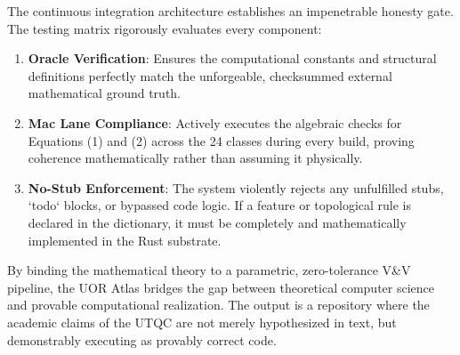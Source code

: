 The continuous integration architecture establishes an impenetrable honesty gate. The testing matrix rigorously evaluates every component:
\begin{enumerate}
    \item \textbf{Oracle Verification}: Ensures the computational constants and structural definitions perfectly match the unforgeable, checksummed external mathematical ground truth.
    \item \textbf{Mac Lane Compliance}: Actively executes the algebraic checks for Equations (1) and (2) across the 24 classes during every build, proving coherence mathematically rather than assuming it physically.
    \item \textbf{No-Stub Enforcement}: The system violently rejects any unfulfilled stubs, `todo` blocks, or bypassed code logic. If a feature or topological rule is declared in the dictionary, it must be completely and mathematically implemented in the Rust substrate.
\end{enumerate}

By binding the mathematical theory to a parametric, zero-tolerance V\&V pipeline, the UOR Atlas bridges the gap between theoretical computer science and provable computational realization. The output is a repository where the academic claims of the UTQC are not merely hypothesized in text, but demonstrably executing as provably correct code.
